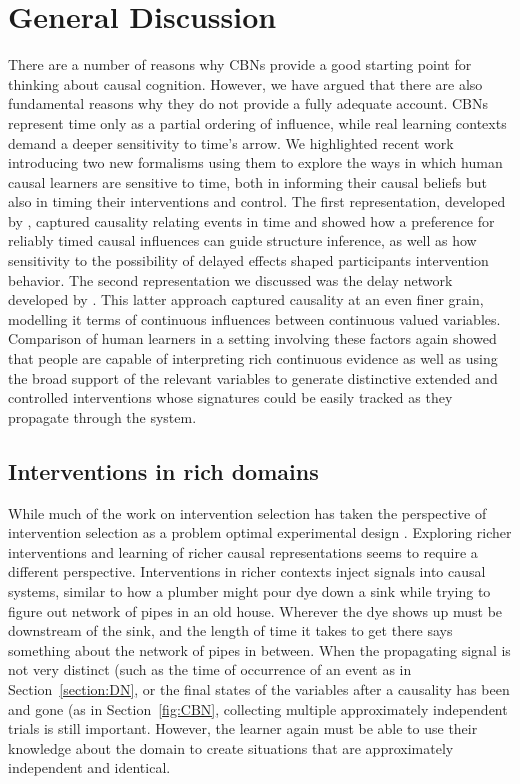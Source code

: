 \documentclass{cambridge7A}%
\begin{document}
\section{General Discussion}

There are a number of reasons why CBNs provide a good starting point for thinking about causal cognition.  However, we have argued that there are also fundamental reasons why they do not provide a fully adequate account.  CBNs represent time only as a partial ordering of influence, while real learning contexts demand a deeper sensitivity to time's arrow.  We highlighted recent work introducing two new formalisms using them to explore the ways in which human causal learners are sensitive to time, both in informing their causal beliefs but also in timing their interventions and control.  The first representation, developed by \cite{bramley2018time}, captured causality relating events in time and showed how a preference for reliably timed causal influences can guide structure inference, as well as how sensitivity to the possibility of delayed effects shaped participants intervention behavior.  The second representation we discussed was the delay network developed by \cite{davis2018control}.  This latter approach captured causality at an even finer grain, modelling it terms of continuous influences between continuous valued variables. Comparison of human learners in a setting involving these factors again showed that people are capable of interpreting rich continuous evidence as well as using the broad support of the relevant variables to generate distinctive extended and controlled interventions whose signatures could be easily tracked as they propagate through the system.

\subsection{Interventions in rich domains}
While much of the work on intervention selection has taken the  perspective of intervention selection as a problem optimal experimental design \citep{fedorov1972theory}.  Exploring richer interventions and learning of richer causal representations seems to require a different perspective.  Interventions in richer contexts inject signals into causal systems, similar to how a plumber might pour dye down a sink while trying to figure out network of pipes in an old house.  Wherever the dye shows up must be downstream of the sink, and the length of time it takes to get there says something about the network of pipes in between.  When the propagating signal is not very distinct (such as the time of occurrence of an event as in Section~\ref{section:DN}, or the final states of the variables after a causality has been and gone (as in Section~\ref{fig:CBN}, collecting multiple approximately independent trials is still important.  However, the learner again must be able to use their knowledge about the domain to create situations that are approximately independent and identical. 
\end{document}
